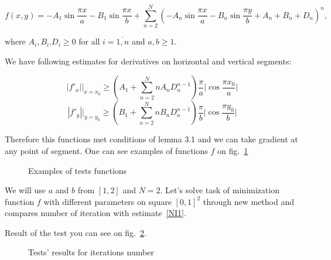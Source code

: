 \documentclass[12pt]{article}
\begin{document}
$$f(x,y) = -A_1\sin\frac{\pi x}{a} - B_1\sin\frac{\pi x}{b} + \sum\limits_{n=2}^N\left(-A_n\sin\frac{\pi x}{a} - B_n\sin\frac{\pi y}{b} + A_n + B_n + D_n\right)^n,$$

where $A_i, B_i. D_i\geq 0$ for all $i = \overline{1, n}$ and $a, b \geq 1$.

We have following estimates for derivatives on horizontal and vertical segments:

$$|f'_x|\Big|_{x = x_0} \geq \left(A_1 + \sum\limits_{n=2}^N n A_n D_n^{n-1}\right)\frac{\pi}{a}\Big|\cos \frac{\pi x_0}{a}\Big|$$
$$|f'_y|\Big|_{y = y_0} \geq \left(B_1 + \sum\limits_{n=2}^N n B_n D_n^{n-1}\right)\frac{\pi}{b}\Big|\cos \frac{\pi y_0}{b}\Big|$$

Therefore this functions met conditions of lemma 3.1 and we can take gradient at any point of segment. One can see examples of functions $f$ on fig.~\ref{fig:examples}

\begin{figure}[H]
\caption{Examples of tests functions}
\label{fig:examples}
\end{figure}

We will use $a$ and $b$ from $[1, 2]$ and $N = 2$. Let's solve task of minimization function $f$ with different parameters on square $[0,1]^2$ through new method and compares number of iteration with estimate~\eqref{NI1}.

Result of the test you can see on fig.~\ref{fig:image}.

\begin{figure}[h!]
\caption{Tests' results for iterations number}
\label{fig:image}
\end{figure}
\end{document}
